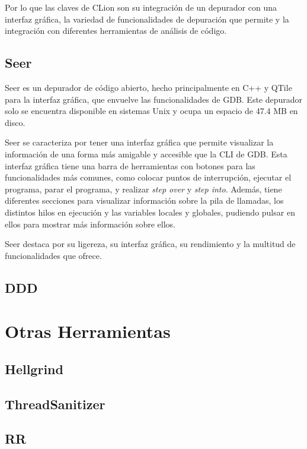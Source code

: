 Por lo que las claves de \gls{CLion} son su integración de un \gls{depurador} con una \gls{interfaz gráfica}, la variedad de funcionalidades de depuración que permite y la integración con diferentes herramientas de análisis de código.

\subsection{Seer}{\label{subsec:seer}}
\gls{Seer} es un depurador de código abierto, hecho principalmente en C++ y QTile para la \gls{interfaz gráfica}, que envuelve las funcionalidades de \gls{GDB}. Este depurador solo se encuentra disponible en sistemas \gls{Unix} y ocupa un espacio de 47.4 MB en disco. 

\gls{Seer} se caracteriza por tener una \gls{interfaz gráfica} que permite visualizar la información de una forma más amigable y accesible que la \gls{CLI} de \gls{GDB}. Esta interfaz gráfica tiene una barra de herramientas con botones para las funcionalidades más comunes, como colocar puntos de interrupción, ejecutar el programa, parar el programa, y realizar \textit{\gls{step over}} y \textit{\gls{step into}}. Además, tiene diferentes secciones para visualizar información sobre la pila de llamadas, los distintos hilos en ejecución y las variables locales y globales, pudiendo pulsar en ellos para mostrar más información sobre ellos.

\gls{Seer} destaca por su ligereza, su \gls{interfaz gráfica}, su rendimiento y la multitud de funcionalidades que ofrece.


\subsection{DDD}{\label{subsec:ddd}}

\section{Otras Herramientas}\label{sec:herramientas}

\subsection{Hellgrind}{\label{subsec:hellgrind}}

\subsection{ThreadSanitizer}{\label{subsec:thread-sanitizer}}

\subsection{RR}{\label{subsec:rr}}




